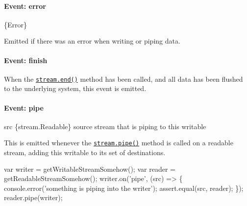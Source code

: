 \paragraph*{Event\+: \textquotesingle{}error\textquotesingle{}}


\begin{DoxyItemize}
\item \{Error\}
\end{DoxyItemize}

Emitted if there was an error when writing or piping data.

\paragraph*{Event\+: \textquotesingle{}finish\textquotesingle{}}

When the \href{#stream_writable_end_chunk_encoding_callback}{\tt {\ttfamily stream.\+end()}} method has been called, and all data has been flushed to the underlying system, this event is emitted.




\paragraph*{Event\+: \textquotesingle{}pipe\textquotesingle{}}


\begin{DoxyItemize}
\item {\ttfamily src} \{stream.\+Readable\} source stream that is piping to this writable
\end{DoxyItemize}

This is emitted whenever the \href{#stream_readable_pipe_destination_options}{\tt {\ttfamily stream.\+pipe()}} method is called on a readable stream, adding this writable to its set of destinations.


\begin{DoxyCode}
var writer = getWritableStreamSomehow();
var reader = getReadableStreamSomehow();
writer.on('pipe', (src) => \{
  console.error('something is piping into the writer');
  assert.equal(src, reader);
\});
reader.pipe(writer);
\end{DoxyCode}


